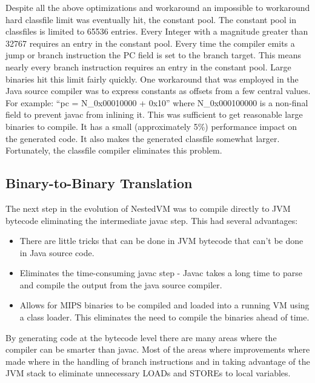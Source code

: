 \documentclass{acmconf}
\begin{document}
Despite all the above optimizations and workaround an impossible to
workaround hard classfile limit was eventually hit, the constant
pool. The constant pool in classfiles is limited to 65536
entries. Every Integer with a magnitude greater than 32767 requires an
entry in the constant pool. Every time the compiler emits a
jump or branch instruction the PC field is set to the branch target. This
means nearly every branch instruction requires an entry in the
constant pool. Large binaries hit this limit fairly quickly. One
workaround that was employed in the Java source compiler was to
express constants as offsets from a few central values. For example:
``pc = N\_0x00010000 + 0x10'' where N\_0x000100000 is a non-final
field to prevent javac from inlining it. This was sufficient to get
reasonable large binaries to compile. It has a small (approximately
5\%) performance impact on the generated code. It also makes the
generated classfile somewhat larger.  Fortunately, the classfile
compiler eliminates this problem.


\subsection{Binary-to-Binary Translation}

The next step in the evolution of NestedVM was to compile directly to
JVM bytecode eliminating the intermediate javac step. This had several
advantages:

\begin{itemize}
      
\item There are little tricks that can be done in JVM bytecode that
      can't be done in Java source code.

\item Eliminates the time-consuming javac step - Javac takes a long
      time to parse and compile the output from the java source
      compiler.

\item Allows for MIPS binaries to be compiled and loaded into a
      running VM using a class loader. This eliminates the need to
      compile the binaries ahead of time.

\end{itemize}

By generating code at the bytecode level there are many areas where
the compiler can be smarter than javac. Most of the areas where
improvements where made where in the handling of branch instructions
and in taking advantage of the JVM stack to eliminate unnecessary
LOADs and STOREs to local variables.
\end{document}
